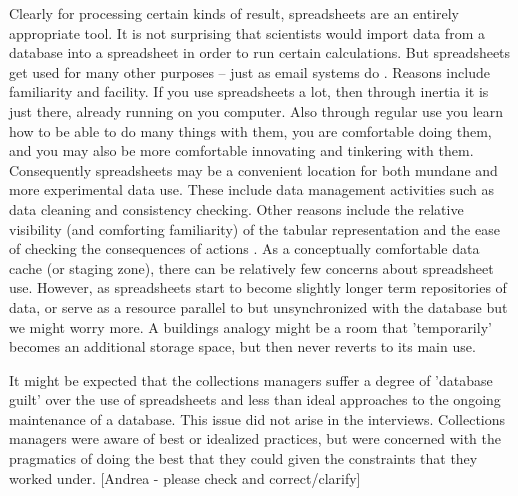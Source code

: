 Clearly for processing certain kinds of result, spreadsheets are an entirely appropriate tool. It is not surprising that scientists would import data from a database into a spreadsheet in order to run certain calculations. But spreadsheets get used for many other purposes – just as email systems do \cite{bellotti2005quality}. Reasons include familiarity and facility. If you use spreadsheets a lot, then through inertia it is just there, already running on you computer. Also through regular use you learn how to be able to do many things with them, you are comfortable doing them, and you may also be more comfortable innovating and tinkering with them.  Consequently spreadsheets may be a convenient location for both mundane and more experimental data use. These include data management activities such as data cleaning and consistency checking.  Other reasons include the relative visibility (and comforting familiarity) of the tabular representation \cite{jagadish2007making} and the ease of checking the consequences of actions \cite{nardi1991twinkling}. As a conceptually comfortable data cache (or staging zone), there can be relatively few concerns about spreadsheet use. However, as spreadsheets start to become slightly longer term repositories of data, or serve as a resource parallel to but unsynchronized with the database but  we might worry more. A buildings analogy might be a room that 'temporarily' becomes an additional storage space, but then never reverts to its main use.

It might be expected that the collections managers suffer a degree of 'database guilt' over the use of spreadsheets and less than ideal approaches to the ongoing maintenance of a database. This issue did not arise in the interviews. Collections managers were aware of best or idealized practices, but were concerned with the pragmatics of doing the best that they could given the constraints that they worked under. [Andrea - please check and correct/clarify]

